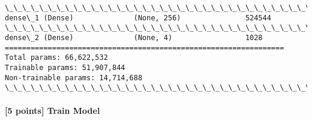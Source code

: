 \documentclass[11pt]{article}
\begin{document}
\begin{Verbatim}[commandchars=\\\{\}]
\_\_\_\_\_\_\_\_\_\_\_\_\_\_\_\_\_\_\_\_\_\_\_\_\_\_\_\_\_\_\_\_\_\_\_\_\_\_\_\_\_\_\_\_\_\_\_\_\_\_\_\_\_\_\_\_\_\_\_\_\_\_\_\_\_
dense\_1 (Dense)              (None, 256)               524544
\_\_\_\_\_\_\_\_\_\_\_\_\_\_\_\_\_\_\_\_\_\_\_\_\_\_\_\_\_\_\_\_\_\_\_\_\_\_\_\_\_\_\_\_\_\_\_\_\_\_\_\_\_\_\_\_\_\_\_\_\_\_\_\_\_
dense\_2 (Dense)              (None, 4)                 1028
=================================================================
Total params: 66,622,532
Trainable params: 51,907,844
Non-trainable params: 14,714,688
\_\_\_\_\_\_\_\_\_\_\_\_\_\_\_\_\_\_\_\_\_\_\_\_\_\_\_\_\_\_\_\_\_\_\_\_\_\_\_\_\_\_\_\_\_\_\_\_\_\_\_\_\_\_\_\_\_\_\_\_\_\_\_\_\_
    \end{Verbatim}

    \hypertarget{points-train-model}{%
\paragraph{{[}5 points{]} Train Model}\label{points-train-model}}
\end{document}
